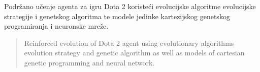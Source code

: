 \documentclass[times, utf8, zavrsni, numeric]{fer}
\begin{document}
 

\begin{sazetak}
    Podržano učenje agenta za igru Dota 2 koristeći evolucijske algoritme
    evolucijske strategije i genetskog algoritma te modele jedinke kartezijskog
    genetskog programiranja i neuronske mreže.

 \end{sazetak}

\begin{abstract}
    Reinforced evolution of Dota 2 agent using evolutionary algorithms evolution
    strategy and genetic algorithm as well as models of cartesian genetic
    programming and neural network.

\end{abstract}
\end{document}
